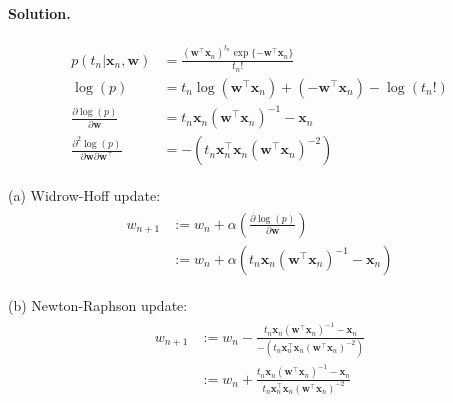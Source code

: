 \documentclass[10pt]{article}
\begin{document}
\begin{itemize}
{\bf Solution.} %

\begin{eqnarray*}
\begin{aligned}
p(t_n | \mathbf{x}_n, \mathbf{w}) &= \frac{(\mathbf{w}^\top\mathbf{x}_n)^{t_n} 
\exp \{ - \mathbf{w}^\top\mathbf{x}_n  \}}{t_n!}
\\
\log(p) &= t_n \log(\mathbf{w}^\top \mathbf{x}_n) + (-\mathbf{w}^\top \mathbf{x}_n) - \log(t_n!)
\\
\frac{\partial \log(p)}{\partial \mathbf{w}} 
&= t_n \mathbf{x}_n (\mathbf{w}^\top \mathbf{x}_n)^{-1} - \mathbf{x}_n
\\
\frac{\partial^2 \log(p)}{\partial \mathbf{w} \partial \mathbf{w}^\top } &=
-( t_n \mathbf{x}_n^\top \mathbf{x}_n ( \mathbf{w}^\top \mathbf{x}_n)^{-2})
\end{aligned}
\end{eqnarray*}

(a)  Widrow-Hoff update:
\begin{eqnarray*}
\begin{aligned}
w_{n+1} &:= w_n + \alpha (\frac{\partial \log(p)}{\partial \mathbf{w}})
\\
&:= w_n + \alpha (t_n \mathbf{x}_n (\mathbf{w}^\top \mathbf{x}_n)^{-1} - \mathbf{x}_n
)
\end{aligned}
\end{eqnarray*}

(b)  Newton-Raphson update:
\begin{eqnarray*}
\begin{aligned}
w_{n+1} &:= w_n - 
\frac{t_n \mathbf{x}_n (\mathbf{w}^\top \mathbf{x}_n)^{-1} - \mathbf{x}_n}
{-( t_n \mathbf{x}_n^\top \mathbf{x}_n ( \mathbf{w}^\top \mathbf{x}_n)^{-2})}
\\
&:= w_n +
\frac{t_n \mathbf{x}_n (\mathbf{w}^\top \mathbf{x}_n)^{-1} - \mathbf{x}_n}
{t_n \mathbf{x}_n^\top \mathbf{x}_n ( \mathbf{w}^\top \mathbf{x}_n)^{-2}}
\end{aligned}
\end{eqnarray*}

\end{itemize}
\end{document}
